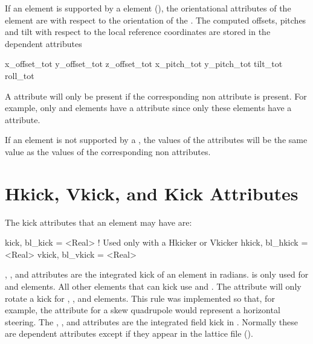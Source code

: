 If an element is supported by a  element (), the orientational attributes
of the element are with respect to the orientation of the . The computed offsets, pitches
and tilt with respect to the local reference coordinates are stored in the dependent attributes
\begin{example}
  x_offset_tot
  y_offset_tot
  z_offset_tot
  x_pitch_tot
  y_pitch_tot
  tilt_tot
  roll_tot
\end{example}
A  attribute will only be present if the corresponding non  attribute is
present. For example, only  and  elements have a  attribute since
only these elements have a  attribute.

If an element is not supported by a , the values of the  attributes will be the
same value as the values of the corresponding non  attributes.

\section{Hkick, Vkick, and Kick Attributes}
\label{s:kick}


The kick attributes that an element may have are:
\begin{example}
  kick,  bl_kick  = <Real>  ! Used only with a Hkicker or Vkicker
  hkick, bl_hkick = <Real>
  vkick, bl_vkick = <Real>
\end{example}
, , and  attributes are the integrated kick of an element in
radians.  is only used for  and  elements. All other elements that
can kick use  and . The  attribute will only rotate a kick for
, ,  and  elements. This rule was implemented so
that, for example, the  attribute for a skew quadrupole would represent a horizontal
steering. The , , and  attributes are the integrated field
kick in . Normally these are dependent attributes except if they appear in the
lattice file ().

